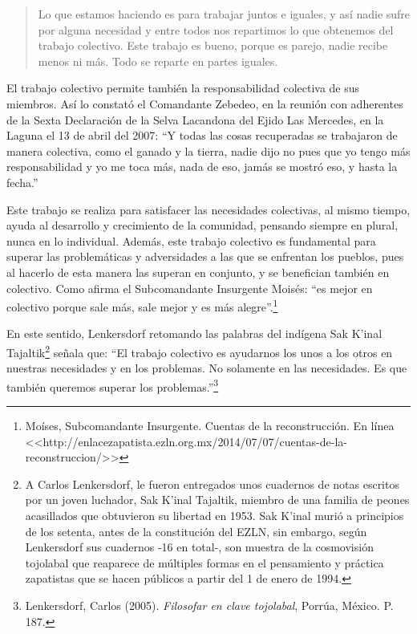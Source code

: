 \documentclass[oneside]{book}
\begin{document}
\begin{quote}
Lo que estamos haciendo es para trabajar juntos e iguales, y así nadie sufre por alguna necesidad y entre todos nos repartimos lo que obtenemos del trabajo colectivo. Este trabajo es bueno, porque es parejo, nadie recibe menos ni más. Todo se reparte en partes iguales.
\end{quote}

El trabajo colectivo permite también la responsabilidad colectiva de sus miembros. Así lo constató el Comandante Zebedeo, en la reunión con adherentes de la Sexta Declaración de la Selva Lacandona del Ejido Las Mercedes, en la Laguna el 13 de abril del 2007: “Y todas las cosas recuperadas se trabajaron de manera colectiva, como el ganado y la tierra, nadie dijo no pues que yo tengo más responsabilidad y yo me toca más, nada de eso, jamás se mostró eso, y hasta la fecha.”

Este trabajo se realiza para satisfacer las necesidades colectivas, al mismo tiempo, ayuda al desarrollo y crecimiento de la comunidad, pensando siempre en plural, nunca en lo individual. Además, este trabajo colectivo es fundamental para superar las problemáticas y adversidades a las que se enfrentan los pueblos, pues al hacerlo de esta manera las superan en conjunto, y se benefician también en colectivo. Como afirma el Subcomandante Insurgente Moisés: “es mejor en colectivo porque sale más, sale mejor y es más alegre''.\footnote{Moíses, Subcomandante Insurgente. Cuentas de la reconstrucción. En línea <<http://enlacezapatista.ezln.org.mx/2014/07/07/cuentas-de-la-reconstruccion/>>}
	
En este sentido, Lenkersdorf retomando las palabras del indígena Sak K'inal Tajaltik\footnote{A Carlos Lenkersdorf, le fueron entregados unos cuadernos de notas escritos por un joven luchador, Sak K’inal Tajaltik, miembro de una familia de peones acasillados que obtuvieron su libertad en 1953. Sak K’inal murió a principios de los setenta, antes de la constitución del EZLN, sin embargo, según Lenkersdorf sus cuadernos -16 en total-, son muestra de la cosmovisión tojolabal que reaparece de múltiples formas en el pensamiento y práctica zapatistas que se hacen públicos a partir del 1 de enero de 1994.} señala que: ``El trabajo colectivo es ayudarnos los unos a los otros en nuestras necesidades y en los problemas. No solamente en las necesidades. Es que también queremos superar los problemas.''\footnote{Lenkersdorf, Carlos (2005). \textit{Filosofar en clave tojolabal}, Porrúa, México. P. 187.}
\end{document}
